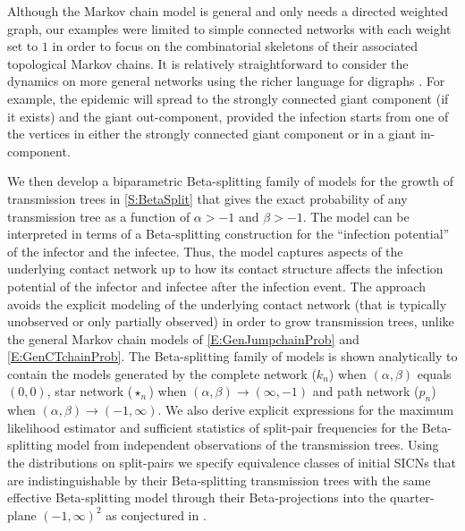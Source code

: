 \documentclass[review]{elsarticle}
\numberwithin{equation}{section}
\let\orgautoref\autoref
\renewcommand{\autoref}
        {\def\equationautorefname{Eq.}%
         \def\figureautorefname{Fig.}%
         \def\subfigureautorefname{Fig.}%
         \def\sectionautorefname{Sect.}%
         \def\subsectionautorefname{Sect.}%
         \def\subsubsectionautorefname{Sect.}%
         \def\Itemautorefname{item}%
         \def\tableautorefname{Table}%
         \def\propositionautorefname{Prop.}%
         \def\corollaryautorefname{Corollary}%
         \def\theoremautorefname{Theorem}%
         \def\remarkautorefname{Remark}%
         \def\lemmaautorefname{Lemma}%
         \def\proofofautorefname{Proof}%
         \def\exampleautorefname{Example}%
         \orgautoref}
\providecommand{\autorefs}
        {\def\equationautorefname{Eqs.}%
         \def\figureautorefname{Figs.}%
         \def\subfigureautorefname{Figs.}%
         \def\sectionautorefname{Sects.}%
         \def\subsectionautorefname{Sects.}%
         \def\subsubsectionautorefname{Sects.}%
         \def\Itemautorefname{items}%
         \def\tableautorefname{Tables}%
         \def\propositionautorefname{Props.}%
         \def\theoremautorefname{Theorems}%
         \def\theoremautorefname{Remarks}%
         \def\lemmaautorefname{Lemmas}%
         \def\proofofautorefname{Proofs}%
         \def\exampleautorefname{Examples}%
         \orgautoref}
\begin{document}
Although the Markov chain model is general and only needs a directed weighted graph, our examples were limited to simple connected networks with each weight set to $1$ in order to focus on the combinatorial skeletons of their associated topological Markov chains.  
It is relatively straightforward to consider the dynamics on more general networks using the richer language for digraphs \citep[Fig.~4]{pastor2015}.  
For example, the epidemic will spread to the strongly connected giant component (if it exists) and the giant out-component, provided the infection starts from one of the vertices in either the strongly connected giant component or in a giant in-component. 

We then develop a biparametric Beta-splitting family of models for the growth of transmission trees in \autoref{S:BetaSplit} that gives the exact probability of any transmission tree as a function of $\alpha > -1$ and $\beta> -1$.  
The model can be interpreted in terms of a Beta-splitting construction for the ``infection potential'' of the infector and the infectee.
Thus, the model captures aspects of the underlying contact network up to how its contact structure affects the infection potential of the infector and infectee after the infection event.
The approach avoids the explicit modeling of the underlying contact network (that is typically unobserved or only partially observed) in order to grow transmission trees, unlike the general Markov chain models of \autorefs{E:GenJumpchainProb} and \ref{E:GenCTchainProb}.  
The Beta-splitting family of models is shown analytically to contain the models generated by the complete network ($k_n$) when $(\alpha,\beta)$ equals $(0,0)$, star network ($\star_n$) when $(\alpha,\beta) \rightarrow (\infty,-1)$ and path network ($p_n$)  when $(\alpha,\beta) \rightarrow (-1,\infty)$.  
We also derive explicit expressions for the maximum likelihood estimator and sufficient statistics of split-pair frequencies for the Beta-splitting model from independent observations of the transmission trees.  
Using the distributions on split-pairs we specify equivalence classes of initial SICNs that are indistinguishable by their Beta-splitting transmission trees with the same effective Beta-splitting model through their Beta-projections into the quarter-plane $(-1,\infty)^2$ as conjectured in \citep{UCDMS20154}.  
\end{document}
